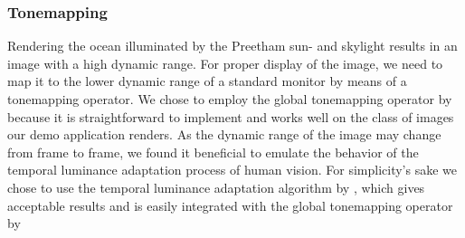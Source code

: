 
\subsubsection{Tonemapping}
Rendering the ocean illuminated by the Preetham sun- and skylight results
in an image with a high dynamic range. For proper display of the image, we
need to map it to the lower dynamic range of a standard monitor by means of
a tonemapping operator. We chose to employ the global tonemapping operator
by \citet[Equation 4]{Reinhard:2002} because it is straightforward to implement
and works well on the class of images our demo application renders.
As the dynamic range of the image may change from frame to frame, we found it
beneficial to emulate the behavior of the temporal luminance adaptation process
of human vision. For simplicity's sake we chose to use the temporal luminance
adaptation algorithm by \citet[Equations 5, 6, 7, 12]{Krawczyk:2005}, which
gives acceptable results and is easily integrated with the global tonemapping
operator by \citeauthor{Reinhard:2002}


